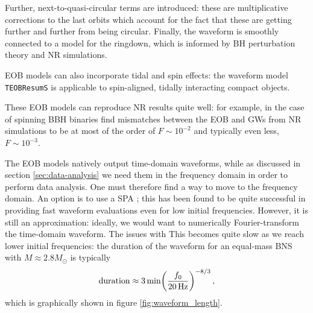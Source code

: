 \documentclass[main.tex]{subfiles}
\begin{document}
Further, next-to-quasi-circular terms are introduced: these are multiplicative corrections to the last orbits which account for the fact that these are getting further and further from being circular. 
Finally, the waveform is smoothly connected to a model for the ringdown, which is informed by \ac{BH} perturbation theory and \ac{NR} simulations. 

\ac{EOB} models can also incorporate tidal and spin effects: the waveform model \texttt{TEOBResumS} \cite{nagarTimedomainEffectiveonebodyGravitational2018} is applicable to spin-aligned, tidally interacting compact objects. 

These \ac{EOB} models can reproduce \ac{NR} results quite well: for example, in the case of spinning \ac{BBH} binaries 
\textcite[fig.\ 2]{nagarAllOneEffective2021} find mismatches between the \ac{EOB} and \acp{GW} from \ac{NR} simulations to be at most of the order of \(F \sim 10^{-2}\) and typically even less, \(F \sim 10^{-3}\).


The \ac{EOB} models natively output time-domain waveforms, while as discussed in section \ref{sec:data-analysis} we need them in the frequency domain in order to perform data analysis. 
One must therefore find a way to move to the frequency domain. An option is to use a \ac{SPA} \cite{gambaFastFaithfulFrequencydomain2020}; this has been found to be quite successful in providing fast waveform evaluations even for low initial frequencies. 
However, it is still an approximation: ideally, we would want to numerically Fourier-transform the time-domain waveform. 
The issues with  
This becomes quite slow as we reach lower initial frequencies: the duration of the waveform for an equal-mass \ac{BNS} with \(M \approx 2.8 M_{\odot}\) is typically \cite[eq.\ 4.21]{maggioreGravitationalWavesVolume2007}
%
\begin{align} \label{eq:waveform-duration}
\text{duration} \approx \SI{3}{min} \qty(\frac{f_0 }{\SI{20}{Hz}})^{-8/3}
\,,
\end{align}
%
which is graphically shown in figure \ref{fig:waveform_length}. 
\end{document}

